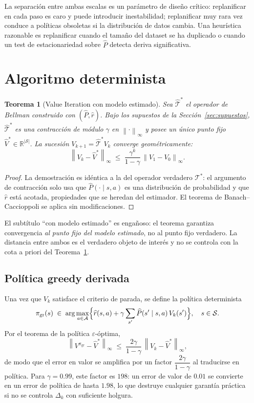 \documentclass[12pt, a4paper]{article}
\theoremstyle{plain}
\newtheorem{theorem}{Teorema}[section]
\theoremstyle{definition}
\newcommand{\cT}{\mathcal{T}}
\newcommand{\cS}{\mathcal{S}}
\newcommand{\cA}{\mathcal{A}}
\newcommand{\norminf}[1]{\left\|#1\right\|_{\infty}}
\newcommand{\R}{\mathbb{R}}
\newcommand{\pigreedy}{\pi_{\mathrm{gr}}}
\newcommand{\Phat}{\widehat{P}}
\newcommand{\rhat}{\widehat{r}}
\begin{document}
La separación entre ambas escalas es un parámetro de diseño crítico:
replanificar en cada paso es caro y puede introducir inestabilidad;
replanificar muy rara vez conduce a políticas obsoletas si la
distribución de datos cambia. Una heurística razonable es replanificar
cuando el tamaño del dataset se ha duplicado o cuando un test de
estacionariedad sobre $\Phat$ detecta deriva significativa.

\section{Algoritmo determinista}
\label{sec:algoritmo}

\begin{theorem}[Value Iteration con modelo estimado]
\label{thm:vi-estimado}
Sea $\widehat{\cT}^{*}$ el operador de Bellman construido con
$(\Phat,\rhat)$. Bajo los supuestos de la Sección~\ref{sec:supuestos},
$\widehat{\cT}^{*}$ es una contracción de módulo $\gamma$ en
$\norminf{\cdot}$ y posee un único punto fijo
$\widehat{V}^{*}\in\R^{|\cS|}$. La sucesión
$V_{k+1}=\widehat{\cT}^{*}V_k$ converge geométricamente:
\[
  \norminf{V_k-\widehat{V}^{*}}
  \;\leq\;\frac{\gamma^k}{1-\gamma}\,\norminf{V_1-V_0}.
\]
\end{theorem}

\begin{proof}
La demostración es idéntica a la del operador verdadero $\cT^{*}$: el
argumento de contracción solo usa que $\Phat(\cdot\mid s,a)$ es una
distribución de probabilidad y que $\rhat$ está acotada, propiedades que
se heredan del estimador. El teorema de Banach--Caccioppoli se aplica
sin modificaciones.
\end{proof}

El subtítulo ``con modelo estimado'' es engañoso: el teorema garantiza
convergencia \emph{al punto fijo del modelo estimado}, no al punto fijo
verdadero. La distancia entre ambos es el verdadero objeto de interés y
no se controla con la cota a priori del Teorema~\ref{thm:vi-estimado}.

\subsection{Política greedy derivada}

Una vez que $V_k$ satisface el criterio de parada, se define la política
determinista
\[
  \pigreedy(s)
  \;\in\;\arg\max_{a\in\cA}\Bigl\{\rhat(s,a)
  +\gamma\sum_{s'}\Phat(s'\mid s,a)\,V_k(s')\Bigr\},
  \quad s\in\cS.
\]
Por el teorema de la política $\varepsilon$-óptima,
\[
  \norminf{V^{\pigreedy}-\widehat{V}^{*}}
  \;\leq\;\frac{2\gamma}{1-\gamma}\,\norminf{V_k-\widehat{V}^{*}},
\]
de modo que el error en valor se amplifica por un factor
$\dfrac{2\gamma}{1-\gamma}$ al traducirse en política. Para $\gamma=0.99$,
este factor es $198$: un error de valor de $0.01$ se convierte en un
error de política de hasta $1.98$, lo que destruye cualquier garantía
práctica si no se controla $\Delta_k$ con suficiente holgura.
\end{document}
